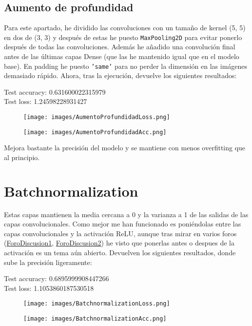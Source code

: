 \documentclass[12pt]{article}
\begin{document}
\subsection*{Aumento de profundidad}
Para este apartado, he dividido las convoluciones con un tamaño de kernel (5, 5) en dos de (3, 3) y después de estas he puesto \texttt{MaxPooling2D} para evitar ponerlo después de todas las convoluciones. Además he añadido una convolución final antes de las últimas capas Dense (que las he mantenido igual que en el modelo base). En padding he puesto \texttt{'same'} para no perder la dimensión en las imágenes demasiado rápido. Ahora, tras la ejecución, devuelve los siguientes resultados:
\\
\begin{center}
Test accuracy: 0.631600022315979\\
Test loss: 1.24598228931427
\end{center}
\begin{figure}[H]
\centering
\parbox{8cm}{
\texttt{[image: images/AumentoProfundidadLoss.png]}
\caption{}
\label{fig:2figsA}}
\begin{minipage}{8cm}
\texttt{[image: images/AumentoProfundidadAcc.png]}
\caption{}
\label{fig:2figsB}
\end{minipage}
\end{figure}
Mejora bastante la precisión del modelo y se mantiene con menos overfitting que al principio.

\section*{Batchnormalization}
Estas capas mantienen la media cercana a 0 y la varianza a 1 de las salidas de las capas convolucionales. Como mejor me han funcionado es poniéndolas entre las capas convolucionales y la activación ReLU, aunque tras mirar en varios foros (\href{https://stackoverflow.com/questions/34716454/where-do-i-call-the-batchnormalization-function-in-keras}{ForoDiscusion1}, \href{https://www.reddit.com/r/MachineLearning/comments/67gonq/d_batch_normalization_before_or_after_relu/}{ForoDiscusion2}) he visto que ponerlas antes o despues de la activación es un tema aún abierto. Devuelven los siguientes resultados, donde sube la precisión ligeramente:
\\
\begin{center}
Test accuracy: 0.6895999908447266\\
Test loss: 1.1053860187530518
\end{center}
\begin{figure}[H]
\centering
\parbox{8cm}{
\texttt{[image: images/BatchnormalizationLoss.png]}
\caption{}
\label{fig:2figsA}}
\begin{minipage}{8cm}
\texttt{[image: images/BatchnormalizationAcc.png]}
\caption{}
\label{fig:2figsB}
\end{minipage}
\end{figure}
\end{document}
